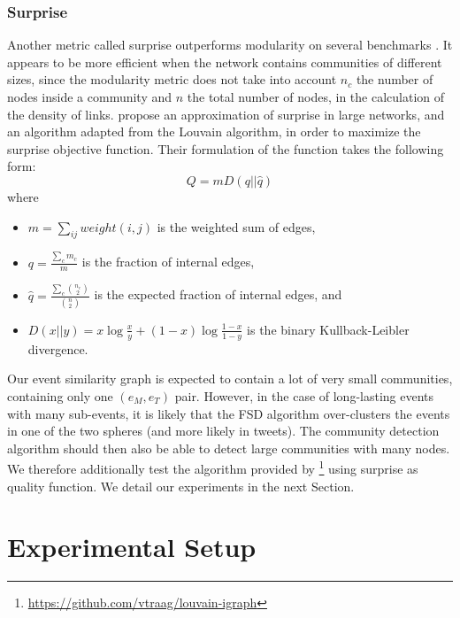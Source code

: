 \subsubsection{Surprise}
Another metric called surprise outperforms modularity on several benchmarks  \citep{aldecoa_deciphering_2011}. It appears to be more efficient when the network contains communities of different sizes, since the modularity metric does not take into account $n_c$ the number of nodes inside a community and $n$ the total number of nodes, in the calculation of the density of links. \cite{traag2015detecting} propose an approximation of surprise in large networks, and an algorithm adapted from the Louvain algorithm, in order to maximize the surprise objective function. Their formulation of the function takes the following form:
\begin{equation}
    Q=mD(q || \hat{q})
\end{equation}
where
\begin{itemize}
    \item $m= \sum\limits_{ij} weight(i,j)$ is the weighted sum of edges,
    \item $q = \frac{\sum\limits_{c}m_c}{m}$ is the fraction of internal edges,
    \item $\hat{q} = \frac{\sum\limits_{c}\binom{n_c}{2}}{\binom{n}{2}}$ is the expected fraction of internal edges, and
    \item $D(x||y) = x \log \frac{x}{y} + (1 - x) \log \frac{1-x}{1-y}$ is the binary Kullback-Leibler divergence.
\end{itemize}
Our event similarity graph is expected to contain a lot of very small communities, containing only one $(e_M, e_T)$ pair. However, in the case of long-lasting events with many sub-events, it is likely that the FSD algorithm over-clusters the events in one of the two spheres (and more likely in tweets). The community detection algorithm should then also be able to detect large communities with many nodes. We therefore additionally test the algorithm provided by \cite{traag2015detecting}\footnote{\url{https://github.com/vtraag/louvain-igraph}} using surprise as quality function. We detail our experiments in the next Section.

\section{Experimental Setup}
